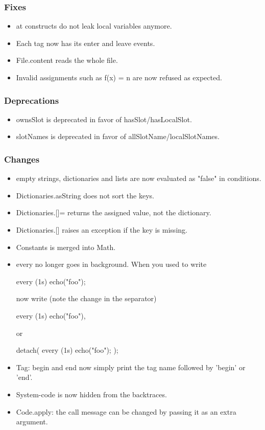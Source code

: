 \subsubsection{Fixes}
\begin{itemize}
\item at constructs do not leak local variables anymore.
\item Each tag now has its enter and leave events.
\item File.content reads the whole file.
\item Invalid assignments such as f(x) = n are now refused as expected.
\end{itemize}

\subsubsection{Deprecations}
\begin{itemize}
\item ownsSlot is deprecated in favor of hasSlot/hasLocalSlot.
\item slotNames is deprecated in favor of allSlotName/localSlotNames.
\end{itemize}

\subsubsection{Changes}
\begin{itemize}
\item empty strings, dictionaries and lists are now evaluated as
  "false" in conditions.
\item Dictionaries.asString does not sort the keys.
\item Dictionaries.[]= returns the assigned value, not the dictionary.
\item Dictionaries.[] raises an exception if the key is missing.
\item Constants is merged into Math.
\item every no longer goes in background.  When you used to write

\begin{urbiunchecked}
every (1s) echo("foo");
\end{urbiunchecked}

  \noindent
  now write (note the change in the separator)

\begin{urbiunchecked}
every (1s) echo("foo"),
\end{urbiunchecked}

  \noindent
  or

\begin{urbiunchecked}
detach({ every (1s) echo("foo"); });
\end{urbiunchecked}

\item Tag: begin and end now simply print the tag name followed by
  'begin' or 'end'.
\item System-code is now hidden from the backtraces.
\item Code.apply: the call message can be changed by passing it as an extra
  argument.
\end{itemize}

